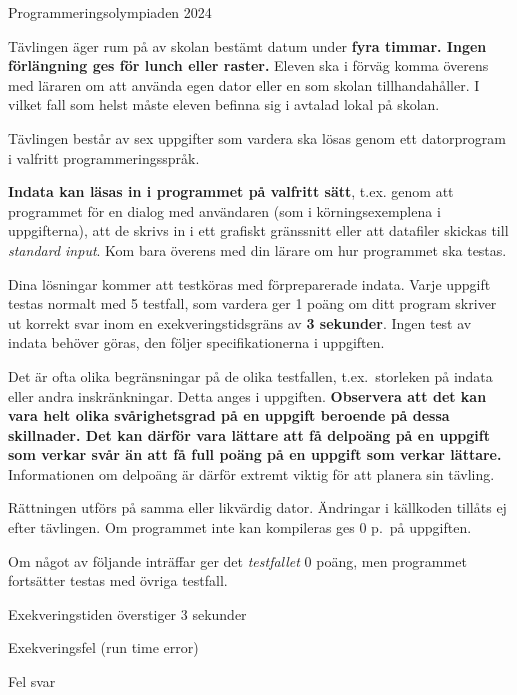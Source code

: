 

\thispagestyle{fancy}
\lstset{basicstyle=\ttfamily,
  breaklines=true}

\begin{center}
\Huge{Programmeringsolympiaden 2024}
\end{center}
\vspace{-1.2cm} 
\begin{lista}
\item Tävlingen äger rum på av skolan bestämt datum under {\bf fyra
    timmar. Ingen förlängning ges för lunch eller raster.} Eleven ska i förväg komma överens med läraren om att använda egen dator eller en som skolan tillhandahåller. I vilket fall som helst måste eleven befinna sig i avtalad lokal på skolan. 
\item Tävlingen består av sex uppgifter som vardera ska lösas genom ett
  datorprogram i valfritt programmeringsspråk.
\item {\bf Indata kan läsas in i programmet på valfritt sätt}, t.ex. genom att programmet för en dialog med användaren (som i körningsexemplena i uppgifterna), att de skrivs in i ett grafiskt gränssnitt eller att datafiler skickas till {\em standard input}. Kom bara överens med din lärare om hur programmet ska testas.
\item Dina lösningar kommer att testköras med förpreparerade
  indata. Varje uppgift testas normalt med 5 testfall, som vardera ger
  1 poäng om ditt program skriver ut korrekt svar inom en exekveringstidsgräns av
  {\bf 3 sekunder}. Ingen test av indata behöver göras, den följer specifikationerna 
i uppgiften.
\item Det är ofta olika begränsningar på de olika testfallen, t.ex.\ storleken på
indata eller andra inskränkningar. Detta anges i uppgiften. {\bf Observera att det kan vara
helt olika svårighetsgrad på en uppgift beroende på dessa skillnader. Det kan därför vara
lättare att få delpoäng på en uppgift som verkar svår än att få full
poäng på en uppgift som verkar lättare.} Informationen om delpoäng är
därför extremt viktig för att planera sin
tävling.
\item Rättningen utförs på samma eller likvärdig dator. Ändringar
  i källkoden tillåts ej efter tävlingen. Om programmet
  inte kan kompileras ges 0 p.\ på uppgiften. 
\item Om något av följande inträffar ger
  det {\em testfallet} 0 poäng, men programmet fortsätter testas med övriga testfall.
\begin{lista}
\item Exekveringstiden överstiger 3 sekunder \vspace{-0.2cm}
\item Exekveringsfel (run time error) \vspace{-0.2cm}
\item Fel svar \vspace{-0.2cm}
\end{lista}


\end{lista}
